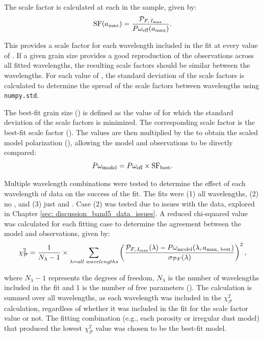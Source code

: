 The scale factor is calculated at each \amax in the sample, given by:
\begin{equation}
\text{SF}(a_{\text{max}}) = \frac{\mathcal{P}_{F, \, I_\text{max}}}{P\omega_\text{eff}(a_{\text{max}})}.
    \label{eq: sf}
\end{equation}


\noindent This provides a scale factor for each wavelength included in the fit at every value of \amaxNS. If a given grain size provides a good reproduction of the observations across all fitted wavelengths, the resulting scale factors should be similar between the wavelengths. For each value of \amaxNS, the standard deviation of the scale factors is calculated to determine the spread of the scale factors between wavelengths using \texttt{numpy.std}. 


The best-fit grain size (\amaxbestNS) is defined as the value of \amax for which the standard deviation of the scale factors is minimized. The corresponding scale factor is the best-fit scale factor (\sfbestNS). The \Pweff values are then multiplied by the \sfbest to obtain the scaled model polarization (\PwmodelNS), allowing the model and observations to be directly compared:
\begin{equation}
    P\omega_\text{{model}} = P\omega_\text{eff} \times \text{SF}_{\text{best}}. 
    \label{eq: P_SF}
\end{equation}




Multiple wavelength combinations were tested to determine the effect of each wavelength of data on the success of the fit. The fits were (1) all wavelengths, (2) no \bfiveNS, and (3) just \bfour and \bsevenNS. Case (2) was tested due to issues with the \bfive data, explored in Chapter \ref{sec: discussion_band5_data_issues}.  A reduced chi-squared value was calculated for each fitting case to determine the agreement between the model and observations, given by: 
\begin{equation}
\chi_\mathcal{P}^2 = \frac{1}{N_\lambda - 1} \times \sum_{\lambda = all\text{ }wavelengths} \left(\frac{\mathcal{P}_{F, \, I_\text{max}}(\lambda) - P\omega_\text{{model}}(\lambda, a_{\text{max, best}})}{\sigma_{\mathcal{P}F} (\lambda)} \right)^2,
    \label{eq: chi_squared_dust_model}
\end{equation}

\noindent where $N_\lambda - 1$ represents the degrees of freedom, $N_\lambda$ is the number of wavelengths included in the fit and 1 is the number of free parameters (\amaxNS). The calculation is summed over all wavelengths, as each wavelength was included in the $\chi_\mathcal{P}^2$ calculation, regardless of whether it was included in the fit for the scale factor value or not. The fitting combination (e.g., each porosity or irregular dust model) that produced the lowest $\chi_\mathcal{P}^2$ value was chosen to be the best-fit model.








